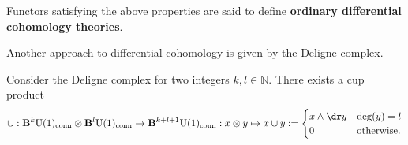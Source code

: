     Functors satisfying the above properties are said to define \textbf{ordinary differential cohomology theories}.

    Another approach to differential cohomology is given by the Deligne complex.

    \begin{property}
        Consider the Deligne complex for two integers $k,l\in\mathbb{N}$. There exists a cup product
        \begin{gather}
            \cup:\mathbf{B}^k\mathrm{U}(1)_\text{conn}\otimes\mathbf{B}^l\mathrm{U}(1)_\text{conn}\rightarrow\mathbf{B}^{k+l+1}\mathrm{U}(1)_\text{conn}:x\otimes y\mapsto x\cup y:=
            \begin{cases}
                x\wedge\dr y&\deg(y)=l\\
                0&\text{otherwise}.
            \end{cases}
        \end{gather}
    \end{property}

